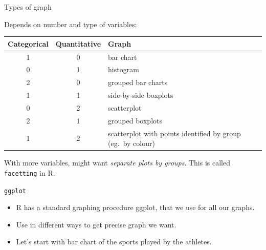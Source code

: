 \documentclass[ignorenonframetext,]{beamer}
\providecommand{\tightlist}{%
  \setlength{\itemsep}{0pt}\setlength{\parskip}{0pt}}
\begin{document}
\begin{frame}[fragile]{Types of graph}
\protect\hypertarget{types-of-graph}{}

Depends on number and type of variables:

\begin{tabular}{ccp{}}
    Categorical & Quantitative & Graph\\
    \hline
    1 & 0 & bar chart\\
    0 & 1 & histogram\\
    2 & 0 & grouped bar charts\\
    1 & 1 & side-by-side boxplots\\
    0 & 2 & scatterplot\\
    2 & 1 & grouped boxplots\\
    1 & 2 & scatterplot with points identified by group (eg.\ by colour)\\
    \hline
  \end{tabular}

With more variables, might want \emph{separate plots by groups}. This is
called \texttt{facetting} in R.

\end{frame}

\begin{frame}{\texttt{ggplot}}
\protect\hypertarget{ggplot}{}

\begin{itemize}
\tightlist
\item
  R has a standard graphing procedure ggplot, that we use for all our
  graphs.
\item
  Use in different ways to get precise graph we want.
\item
  Let's start with bar chart of the sports played by the athletes.
\end{itemize}

\end{frame}
\end{document}
